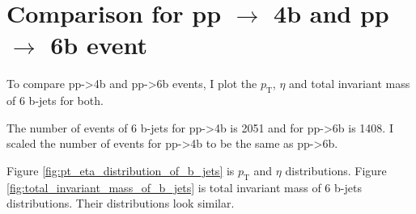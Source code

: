 \documentclass[12pt]{article}
\begin{document}
\section{Comparison for \texorpdfstring{pp $\to$ 4b}{pp to 4b} and \texorpdfstring{pp $\to$ 6b}{pp to 6b} event}%
\label{sec:comparison_for_pp_4b_and_pp_6b_event}
	To compare pp->4b and pp->6b events, I plot the $p_\text{T}$, $\eta$ and total invariant mass of 6 b-jets for both.  
	
	The number of events of 6 b-jets for pp->4b is 2051 and for pp->6b is 1408. I scaled the number of events for pp->4b to be the same as pp->6b.

	Figure \ref{fig:pt_eta_distribution_of_b_jets} is $p_\text{T}$ and $\eta$ distributions. Figure \ref{fig:total_invariant_mass_of_b_jets} is total invariant mass of 6 b-jets distributions. Their distributions look similar.
\end{document}
